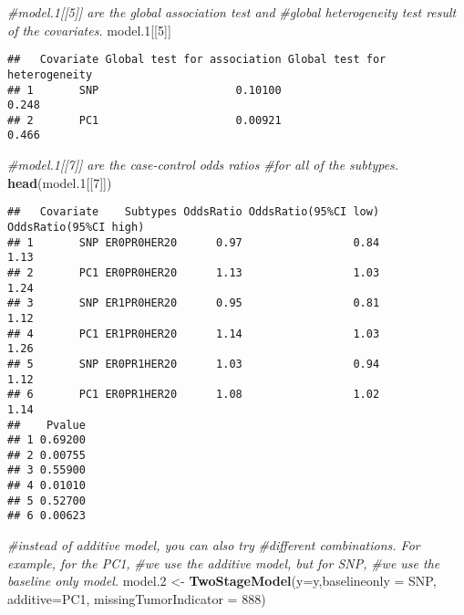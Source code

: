 \documentclass[11pt,]{article}
\newenvironment{Shaded}{\begin{snugshade}}{\end{snugshade}}
\newcommand{\CommentTok}[1]{\textcolor[rgb]{0.56,0.35,0.01}{\textit{#1}}}
\newcommand{\DataTypeTok}[1]{\textcolor[rgb]{0.13,0.29,0.53}{#1}}
\newcommand{\DecValTok}[1]{\textcolor[rgb]{0.00,0.00,0.81}{#1}}
\newcommand{\FloatTok}[1]{\textcolor[rgb]{0.00,0.00,0.81}{#1}}
\newcommand{\KeywordTok}[1]{\textcolor[rgb]{0.13,0.29,0.53}{\textbf{#1}}}
\newcommand{\NormalTok}[1]{#1}
\newcommand{\StringTok}[1]{\textcolor[rgb]{0.31,0.60,0.02}{#1}}
\begin{document}
\begin{Shaded}
\begin{Highlighting}[]
\CommentTok{#model.1[[5]] are the global association test and }
\CommentTok{#global heterogeneity test result of the covariates.}
\NormalTok{model}\FloatTok{.1}\NormalTok{[[}\DecValTok{5}\NormalTok{]]}
\end{Highlighting}
\end{Shaded}

\begin{verbatim}
##   Covariate Global test for association Global test for heterogeneity
## 1       SNP                     0.10100                         0.248
## 2       PC1                     0.00921                         0.466
\end{verbatim}

\begin{Shaded}
\begin{Highlighting}[]
\CommentTok{#model.1[[7]] are the case-control odds ratios }
\CommentTok{#for all of the subtypes.}
\KeywordTok{head}\NormalTok{(model}\FloatTok{.1}\NormalTok{[[}\DecValTok{7}\NormalTok{]])}
\end{Highlighting}
\end{Shaded}

\begin{verbatim}
##   Covariate    Subtypes OddsRatio OddsRatio(95%CI low) OddsRatio(95%CI high)
## 1       SNP ER0PR0HER20      0.97                 0.84                  1.13
## 2       PC1 ER0PR0HER20      1.13                 1.03                  1.24
## 3       SNP ER1PR0HER20      0.95                 0.81                  1.12
## 4       PC1 ER1PR0HER20      1.14                 1.03                  1.26
## 5       SNP ER0PR1HER20      1.03                 0.94                  1.12
## 6       PC1 ER0PR1HER20      1.08                 1.02                  1.14
##    Pvalue
## 1 0.69200
## 2 0.00755
## 3 0.55900
## 4 0.01010
## 5 0.52700
## 6 0.00623
\end{verbatim}

\begin{Shaded}
\begin{Highlighting}[]
\CommentTok{#instead of additive model, you can also try }
\CommentTok{#different combinations. For example, for the PC1,}
\CommentTok{#we use the additive model, but for SNP,}
\CommentTok{#we use the baseline only model.}
\NormalTok{model}\FloatTok{.2}\NormalTok{ <-}\StringTok{ }\KeywordTok{TwoStageModel}\NormalTok{(}\DataTypeTok{y=}\NormalTok{y,}\DataTypeTok{baselineonly =}\NormalTok{ SNP,}
                         \DataTypeTok{additive=}\NormalTok{PC1,}
                         \DataTypeTok{missingTumorIndicator =} \DecValTok{888}\NormalTok{)}
\end{Highlighting}
\end{Shaded}
\end{document}
